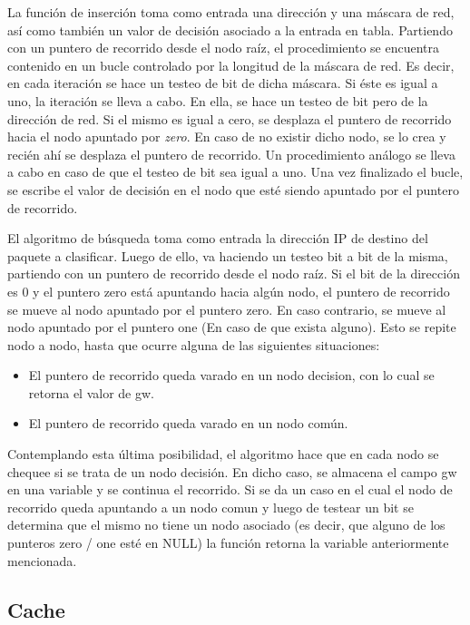 La función de inserción toma como entrada una dirección y una máscara de red, así como también un valor de decisión asociado a la entrada en tabla. Partiendo con un puntero de recorrido desde el nodo raíz, el procedimiento se encuentra contenido en un bucle controlado por la longitud de la máscara de red. Es decir, en cada iteración se hace un testeo de bit de dicha máscara. Si éste es igual a uno, la iteración se lleva a cabo. En ella, se hace un testeo de bit pero de la dirección de red. Si el mismo es igual a cero, se desplaza el puntero de recorrido hacia el nodo apuntado por \textit{zero}. En caso de no existir dicho nodo, se lo crea y recién ahí se desplaza el puntero de recorrido. Un procedimiento análogo se lleva a cabo en caso de que el testeo de bit sea igual a uno.
Una vez finalizado el bucle, se escribe el valor de decisión en el nodo que esté siendo apuntado por el puntero de recorrido.


El algoritmo de búsqueda toma como entrada la dirección IP de destino del paquete a clasificar. Luego de ello, va haciendo un testeo bit a bit de la misma, partiendo con un puntero de recorrido desde el nodo raíz. Si el bit de la dirección es 0 y el puntero zero está apuntando hacia algún nodo, el puntero de recorrido se mueve al nodo apuntado por el puntero zero. En caso contrario, se mueve al nodo apuntado por el puntero one (En caso de que exista alguno). Esto se repite nodo a nodo, hasta que ocurre alguna de las siguientes situaciones:

\begin{itemize}
    	\item     El puntero de recorrido queda varado en un nodo decision, con lo cual se retorna el valor de gw.
    	\item El puntero de recorrido queda varado en un nodo común. 
\end{itemize}



Contemplando esta última posibilidad, el algoritmo hace que en cada nodo se chequee si se trata de un nodo decisión. En dicho caso, se almacena el campo gw en una variable y se continua el recorrido. Si se da un caso en el cual el nodo de recorrido queda apuntando a un nodo comun y luego de testear un bit se determina que el mismo no tiene un nodo asociado (es decir, que alguno de los punteros zero / one esté en NULL) la función retorna la variable anteriormente mencionada. 

\subsection {Cache}

